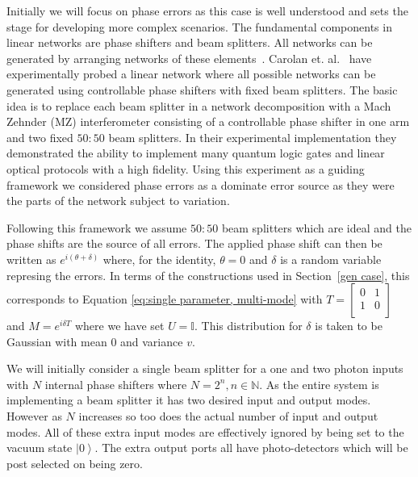 \documentclass[aps,pra,twocolumn,superscriptaddress,numerical,floatfix]{revtex4-1}
\begin{document}

Initially we will focus on phase errors as this case is well understood and sets the stage for developing more complex scenarios.  The fundamental components in linear networks are phase shifters and beam splitters.  All networks can be generated by arranging networks of these elements~\cite{reck}.  Carolan et. al.~\cite{ULO} have experimentally probed a linear network where all possible networks can be generated using controllable phase shifters with fixed beam splitters. The basic idea is to replace each beam splitter in a network decomposition with a Mach Zehnder (MZ) interferometer consisting of a controllable phase shifter in one arm and two fixed $50:50$ beam splitters. In their experimental implementation they demonstrated the ability to implement many quantum logic gates and linear optical protocols with a high fidelity.  Using this experiment as a guiding framework we considered phase errors as a dominate error source as they were the parts of the network subject to variation. 
	
Following this framework we assume $50:50$ beam splitters which are ideal and the phase shifts are the source of all errors. The applied phase shift can then be written as $e^{i(\theta+\delta)}$ where, for the identity, $\theta=0$ and $\delta$ is a random variable represing the errors.  In terms of the constructions used in Section~\ref{gen case}, this corresponds to Equation \ref{eq:single parameter, multi-mode} with $T=\begin{bmatrix}	0 & 1 \\	1 & 0 \\\end{bmatrix}$ and $M=e^{i\delta T}$ where we have set $U=\mathbb{I}$. This distribution for $\delta$ is taken to be Gaussian with mean $0$ and variance $v$. 

We will initially consider a single beam splitter for a one and two photon inputs with $N$ internal phase shifters where $N=2^{n},n\in\mathbb{N}$. As the entire system is implementing a beam splitter it has two desired input and output modes. However as $N$ increases so too does the actual number of input and output modes. All of these extra input modes are effectively ignored by being set to the vacuum state $\left|0\right\rangle $. The extra output ports all have photo-detectors which will be post selected on being zero.
		
\end{document}
